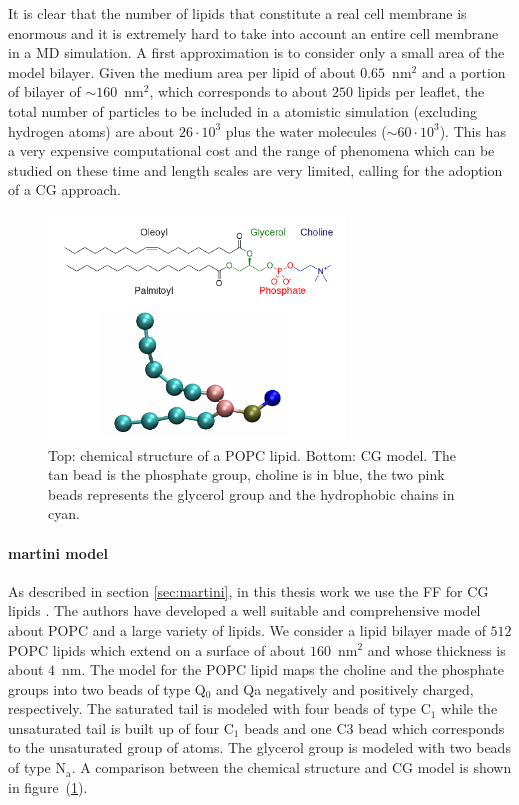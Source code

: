 It is clear that the number of lipids that constitute a real cell membrane is enormous and it is extremely hard to take into account an entire cell membrane in a \ac{MD} simulation. A first approximation is to consider only a small area of the model bilayer. Given the medium area per lipid of about $0.65$~nm$^2$ and a portion of bilayer of $\sim 160$~nm$^2$, which corresponds to about $250$ lipids per leaflet, the total number of particles to be included in a atomistic simulation (excluding hydrogen atoms) are about $26\cdot 10^3$ plus the water molecules ($\sim 60\cdot 10^3$). This has a very expensive computational cost and the range of phenomena which can be studied on these time and length scales are very limited, calling for the adoption of a \ac{CG} approach.

\begin{figure}[!ht]
	\centering
	\includegraphics[width=0.7\textwidth]{./img/POPC/popc}
	\caption{Top: chemical structure of a \acs{POPC} lipid. Bottom: \martini \acs{CG} model. The tan bead is the phosphate group, choline is in blue, the two pink beads represents the glycerol group and the hydrophobic chains in cyan.}
	\label{fig:popc}
\end{figure}

\paragraph{\textbf{martini model}} As described in section \ref{sec:martini}, in this thesis work we use the \martini \ac{FF} for \ac{CG} lipids \cite{Martini}. The authors have developed a well suitable and comprehensive model about \ac{POPC} and a large variety of lipids. We consider a lipid bilayer made of $512$ \ac{POPC} lipids which extend on a surface of about $160$~nm$^2$ and whose thickness is about $4$~nm. The \martini model for the \ac{POPC} lipid maps the choline and the phosphate groups into two beads of type Q$_0$ and Qa negatively and positively charged, respectively. The saturated tail is modeled with four beads of type C$_1$ while the unsaturated tail is built up of four C$_1$ beads and one C$3$ bead which corresponds to the unsaturated group of atoms. The glycerol group is modeled with two beads of type N$_\text{a}$. A comparison between the chemical structure and \ac{CG} model is shown in figure~(\ref{fig:popc}).

